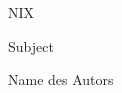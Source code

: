 \documentclass[a4paper,10pt]{tubsartcl}
\begin{document}
\lipsum[1-3]

\begin{titlepage}
\begin{titlerow}[bgimage=titlepicture]{2}\end{titlerow}
\begin{titlerow}[bgcolor=tuSecondaryDark]{1}NIX\end{titlerow}
\begin{titlerow}[bgcolor=tuSecondaryLight]{2}Subject\end{titlerow}
\begin{titlerow}[bgcolor=tuSecondary]{1}\date{}\end{titlerow}
\begin{titlerow}[bgcolor=tuSecondaryLight]{2}\sffamily\huge Name des Autors\end{titlerow}
\end{titlepage}
\end{document}
